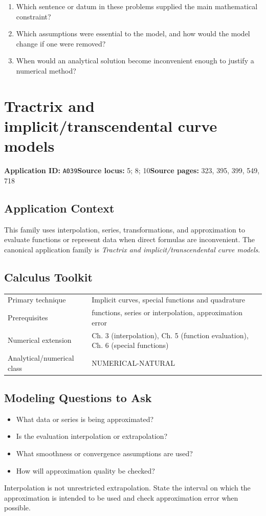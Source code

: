 \documentclass[11pt]{book}
\newcommand{\pid}[1]{\texttt{#1}}
\begin{document}
\begin{reflectionbox}\begin{enumerate}
\item Which sentence or datum in these problems supplied the main mathematical constraint?
\item Which assumptions were essential to the model, and how would the model change if one were removed?
\item When would an analytical solution become inconvenient enough to justify a numerical method?
\end{enumerate}\end{reflectionbox}
\chapter{Tractrix and implicit/transcendental curve models}\label{app:A039}
\textbf{Application ID:} \pid{A039}\quad \textbf{Source locus:} 5; 8; 10\quad \textbf{Source pages:} 323, 395, 399, 549, 718
\section*{Application Context}
This family uses interpolation, series, transformations, and approximation to evaluate functions or represent data when direct formulas are inconvenient. The canonical application family is \emph{Tractrix and implicit/transcendental curve models}.
\section*{Calculus Toolkit}
\begin{tabularx}{\textwidth}{@{}lX@{}}\toprule
Primary technique & Implicit curves, special functions and quadrature \\
Prerequisites & functions, series or interpolation, approximation error \\
Numerical extension & Ch. 3 (interpolation), Ch. 5 (function evaluation), Ch. 6 (special functions) \\
Analytical/numerical class & NUMERICAL-NATURAL \\
\bottomrule\end{tabularx}
\section*{Modeling Questions to Ask}\begin{itemize}
\item What data or series is being approximated?
\item Is the evaluation interpolation or extrapolation?
\item What smoothness or convergence assumptions are used?
\item How will approximation quality be checked?
\end{itemize}
\begin{errorbox}Interpolation is not unrestricted extrapolation. State the interval on which the approximation is intended to be used and check approximation error when possible.\end{errorbox}
\end{document}
